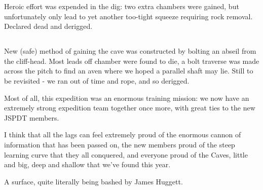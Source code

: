 Heroic effort was expended in the  dig: two extra chambers were
gained, but unfortunately only lead to yet another too-tight squeeze
requiring rock removal. Declared dead and derigged.

\subsection{\protect{}}

New (safe) method of gaining the cave was constructed by bolting an
abseil from the cliff-head. Most leads off chamber were found to die, a
bolt traverse was made across the pitch to find an aven where we hoped a
parallel shaft may lie. Still to be revisited - we ran out of time and
rope, and so derigged.

Most of all, this expedition was an enormous training mission: we now
have an extremely strong expedition team together once more, with great
ties to the new JSPDT members.

I think that all the lags can feel extremely proud of the enormous
cannon of information that has been passed on, the new members proud of
the steep learning curve that they all conquered, and everyone proud of
the Caves, little and big, deep and shallow that we've found this year.



\begin{pagefigure}
      \checkoddpage \ifoddpage \forcerectofloat \else \forceversofloat \fi
      \centering
       \label{surface bashing}
  \caption{A surface, quite literally being bashed by James Huggett. }
\end{pagefigure}

